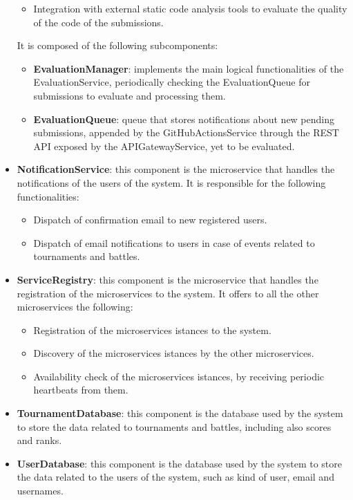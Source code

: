 \begin{itemize}
\begin{itemize}
        \item Integration with external static code analysis tools to evaluate the quality of the code of the submissions.
    \end{itemize}
    It is composed of the following subcomponents:
    \begin{itemize}
        \item \textbf{EvaluationManager}: implements the main logical functionalities of the EvaluationService, periodically checking the EvaluationQueue for submissions to evaluate and processing them.
        \item \textbf{EvaluationQueue}: queue that stores notifications about new pending submissions, appended by the GitHubActionsService through the REST API exposed by the APIGatewayService, yet to be evaluated.
    \end{itemize}
    \item \textbf{NotificationService}: this component is the microservice that handles the notifications of the users of the system. It is responsible for the following functionalities:
    \begin{itemize}
        \item Dispatch of confirmation email to new registered users.
        \item Dispatch of email notifications to users in case of events related to tournaments and battles.
    \end{itemize}
    \item \textbf{ServiceRegistry}: this component is the microservice that handles the registration of the microservices to the system. It offers to all the other microservices the following:
    \begin{itemize}
        \item Registration of the microservices istances to the system.
        \item Discovery of the microservices istances by the other microservices.
        \item Availability check of the microservices istances, by receiving periodic heartbeats from them.
    \end{itemize}
    \item \textbf{TournamentDatabase}: this component is the database used by the system to store the data related to tournaments and battles, including also scores and ranks.
    \item \textbf{UserDatabase}: this component is the database used by the system to store the data related to the users of the system, such as kind of user, email and usernames.
\end{itemize}
